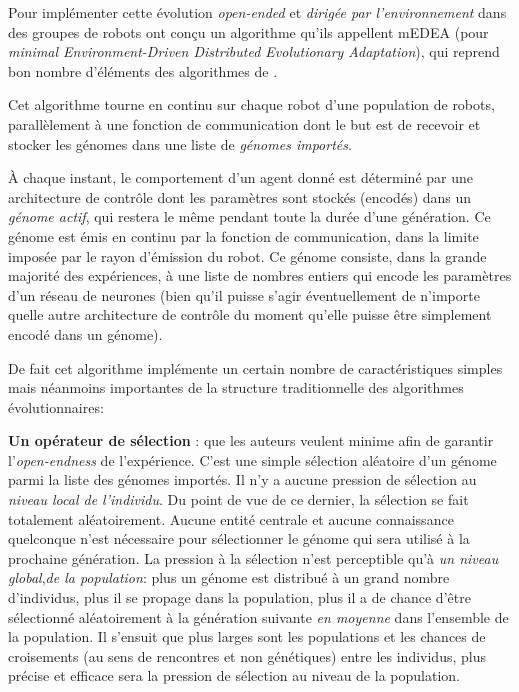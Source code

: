 Pour implémenter cette évolution \emph{open-ended} et \emph{dirigée par l'environnement} dans des groupes de robots \cite{bredeche11mcmds} ont conçu un algorithme qu'ils appellent mEDEA (pour \emph{minimal Environment-Driven Distributed Evolutionary Adaptation}), qui reprend bon nombre d'éléments des algorithmes de \cite{watson02embodiedevolutiondistributingevolutionaryalgorithmpopulationrobots}.

Cet algorithme tourne en continu sur chaque robot d'une population de robots, parallèlement à une fonction de communication dont le but est de recevoir et stocker les génomes dans une liste de \emph{génomes importés}.

À chaque instant, le comportement d'un agent donné est déterminé par une architecture de contrôle dont les paramètres sont stockés (encodés) dans un \emph{génome actif}, qui restera le même pendant toute la durée d'une génération. Ce génome est émis en continu par la fonction de communication, dans la limite imposée par le rayon d'émission du robot. Ce génome consiste, dans la grande majorité des expériences, à une liste de nombres entiers qui encode les paramètres d'un réseau de neurones (bien qu'il puisse s'agir éventuellement de n'importe quelle autre architecture de contrôle du moment qu'elle puisse être simplement encodé dans un génome).

De fait cet algorithme implémente un certain nombre de caractéristiques simples mais néanmoins importantes de la structure traditionnelle des algorithmes évolutionnaires:

\textbf{Un opérateur de sélection }: que les auteurs veulent minime afin de garantir l'\emph{open-endness} de l'expérience. C'est une simple sélection aléatoire d'un génome parmi la liste des génomes importés. Il n'y a aucune pression de sélection au \emph{niveau local de l'individu}. Du point de vue de ce dernier, la sélection se fait totalement aléatoirement. Aucune entité centrale et aucune connaissance quelconque n'est nécessaire pour sélectionner le génome qui sera utilisé à la prochaine génération. La pression à la sélection n'est perceptible qu'à \emph{un niveau global},\emph{de la population}: plus un génome est distribué à un grand nombre d'individus, plus il se propage dans la population, plus il a de chance d'être sélectionné aléatoirement à la génération suivante \emph{en moyenne} dans l'ensemble de la population. Il s'ensuit que plus larges sont les populations et les chances de croisements (au sens de rencontres et non génétiques) entre les individus, plus précise et efficace sera la pression de sélection au niveau de la population.


